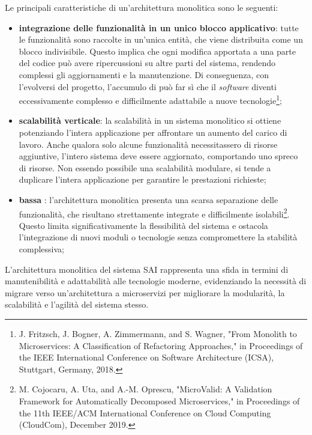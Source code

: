             \vspace{0.2 em}
            \noindent Le principali caratteristiche di un’architettura monolitica sono le seguenti:  

            \begin{itemize}
                \item \textbf{integrazione delle funzionalità in un unico blocco applicativo}: tutte le funzionalità sono raccolte in un’unica entità, che viene distribuita come un blocco indivisibile. Questo implica che ogni modifica apportata a una parte del codice può avere ripercussioni su altre parti del sistema, rendendo complessi gli aggiornamenti e la manutenzione. Di conseguenza, con l’evolversi del progetto, l’accumulo di  può far sì che il \textit{software} diventi eccessivamente complesso e difficilmente adattabile a nuove tecnologie\footnote{J. Fritzsch, J. Bogner, A. Zimmermann, and S. Wagner, "From Monolith to Microservices: A Classification of Refactoring Approaches," in Proceedings of the IEEE International Conference on Software Architecture (ICSA), Stuttgart, Germany, 2018.};
                \item  \textbf{scalabilità verticale}: la scalabilità in un sistema monolitico si ottiene potenziando l’intera applicazione per affrontare un aumento del carico di lavoro. Anche qualora solo alcune funzionalità necessitassero di risorse aggiuntive, l’intero sistema deve essere aggiornato, comportando uno spreco di risorse. Non essendo possibile una scalabilità modulare, si tende a duplicare l’intera applicazione per garantire le prestazioni richieste;
                \item \textbf{bassa} : l’architettura monolitica presenta una scarsa separazione delle funzionalità, che risultano strettamente integrate e difficilmente isolabili\footnote{M. Cojocaru, A. Uta, and A.-M. Oprescu, "MicroValid: A Validation Framework for Automatically Decomposed Microservices," in Proceedings of the 11th IEEE/ACM International Conference on Cloud Computing (CloudCom), December 2019.}. Questo limita significativamente la flessibilità del sistema e ostacola l’integrazione di nuovi moduli o tecnologie senza compromettere la stabilità complessiva; 
            \end{itemize}  

            \vspace{0.2 em}
            \noindent L’architettura monolitica del sistema SAI rappresenta una sfida in termini di manutenibilità e adattabilità alle tecnologie moderne, evidenziando la necessità di migrare verso un’architettura a microservizi per migliorare la modularità, la scalabilità e l’agilità del sistema stesso.

